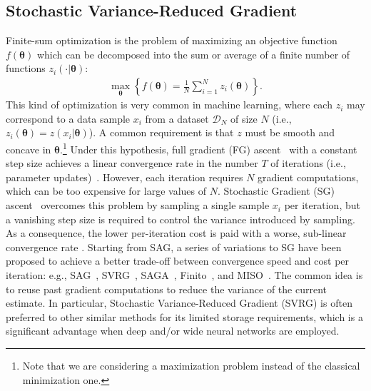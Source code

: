 \documentclass{article}
\makeatletter
\theoremstyle{remark}
\theoremstyle{definition}
\DeclareRobustCommand{\eg}{e.g.,\@\xspace}
\DeclareRobustCommand{\ie}{i.e.,\@\xspace}
\newcommand{\vtheta}{\boldsymbol{\theta}}
\makeatother
\begin{document}
\subsection{Stochastic Variance-Reduced Gradient}\label{sec:svrg}
\vspace{-0.05in}
Finite-sum optimization is the problem of maximizing an objective function $f(\vtheta)$ which can be decomposed into the sum or average of a finite number of functions $z_i(\cdot|\vtheta)$:
\begin{align*}
        \max_{\vtheta} \left\{ f(\vtheta) = \frac{1}{N}\sum_{i=1}^{N}z_i(\vtheta)\right\}.
\end{align*}
This kind of optimization is very common in machine learning, where each $z_i$ may correspond to a data sample $x_i$ from a dataset $\mathcal{D}_N$ of size $N$ (\ie $z_i(\vtheta) = z(x_i|\vtheta)$). 
A common requirement is that $z$ must be smooth and concave in $\vtheta$.\footnote{Note that we are considering a maximization problem instead of the classical minimization one.} 
Under this hypothesis, full gradient (FG) ascent~\citep{cauchy1847methode} with a constant step size achieves a linear convergence rate in the number $T$ of iterations (\ie parameter updates)~\citep{nesterov2013introductory}.
However, each iteration requires $N$ gradient computations, which can be too expensive for large values of $N$. Stochastic Gradient (SG) ascent~\citep[\eg][]{robbins1951stochastic,bottou2004large} overcomes this problem by sampling a single sample $x_i$ per iteration, but a vanishing step size is required to control the variance introduced by sampling. As a consequence, the lower per-iteration cost is paid with a worse, sub-linear convergence rate \cite{nemirovskii1983problem}.
Starting from SAG, a series of variations to SG have been proposed to achieve a better trade-off between convergence speed and cost per iteration: \eg SAG~\citep{roux2012stochastic}, SVRG~\cite{johnson2013accelerating}, SAGA~\cite{defazio2014saga}, Finito~\cite{defazio2014finito}, and MISO~\cite{mairal2015incremental}. 
The common idea is to reuse past gradient computations to reduce the variance of the current estimate.
In particular, Stochastic Variance-Reduced Gradient (SVRG) is often preferred to other similar methods for its limited storage requirements, which is a significant advantage when deep and/or wide neural networks are employed.  
\end{document}
